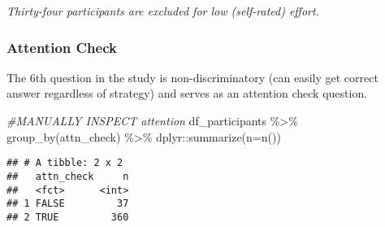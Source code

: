 \documentclass[
]{article}
\newenvironment{Shaded}{\begin{snugshade}}{\end{snugshade}}
\newcommand{\AttributeTok}[1]{\textcolor[rgb]{0.77,0.63,0.00}{#1}}
\newcommand{\CommentTok}[1]{\textcolor[rgb]{0.56,0.35,0.01}{\textit{#1}}}
\newcommand{\FunctionTok}[1]{\textcolor[rgb]{0.00,0.00,0.00}{#1}}
\newcommand{\NormalTok}[1]{#1}
\newcommand{\OtherTok}[1]{\textcolor[rgb]{0.56,0.35,0.01}{#1}}
\newcommand{\SpecialCharTok}[1]{\textcolor[rgb]{0.00,0.00,0.00}{#1}}
\newcommand{\StringTok}[1]{\textcolor[rgb]{0.31,0.60,0.02}{#1}}
\begin{document}
\begin{Shaded}
\end{Shaded}

\emph{Thirty-four participants are excluded for low (self-rated)
effort.}

\hypertarget{attention-check}{%
\subsubsection{Attention Check}\label{attention-check}}

The 6th question in the study is non-discriminatory (can easily get
correct answer regardless of strategy) and serves as an attention check
question.

\begin{Shaded}
\begin{Highlighting}[]
\CommentTok{\#MANUALLY INSPECT attention}
\NormalTok{df\_participants }\SpecialCharTok{\%\textgreater{}\%} \FunctionTok{group\_by}\NormalTok{(attn\_check) }\SpecialCharTok{\%\textgreater{}\%} 
\NormalTok{  dplyr}\SpecialCharTok{::}\FunctionTok{summarize}\NormalTok{(}\AttributeTok{n=}\FunctionTok{n}\NormalTok{())}
\end{Highlighting}
\end{Shaded}

\begin{verbatim}
## # A tibble: 2 x 2
##   attn_check     n
##   <fct>      <int>
## 1 FALSE         37
## 2 TRUE         360
\end{verbatim}
\end{document}
